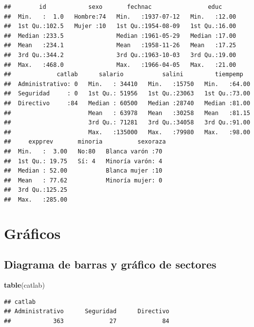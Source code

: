 \documentclass[]{book}
\newenvironment{Shaded}{\begin{snugshade}}{\end{snugshade}}
\newcommand{\KeywordTok}[1]{\textcolor[rgb]{0.13,0.29,0.53}{\textbf{#1}}}
\newcommand{\DataTypeTok}[1]{\textcolor[rgb]{0.13,0.29,0.53}{#1}}
\newcommand{\DecValTok}[1]{\textcolor[rgb]{0.00,0.00,0.81}{#1}}
\newcommand{\StringTok}[1]{\textcolor[rgb]{0.31,0.60,0.02}{#1}}
\newcommand{\OperatorTok}[1]{\textcolor[rgb]{0.81,0.36,0.00}{\textbf{#1}}}
\newcommand{\NormalTok}[1]{#1}
\begin{document}
\begin{verbatim}
##        id            sexo       fechnac                educ      
##  Min.   :  1.0   Hombre:74   Min.   :1937-07-12   Min.   :12.00  
##  1st Qu.:102.5   Mujer :10   1st Qu.:1954-08-09   1st Qu.:16.00  
##  Median :233.5               Median :1961-05-29   Median :17.00  
##  Mean   :234.1               Mean   :1958-11-26   Mean   :17.25  
##  3rd Qu.:344.2               3rd Qu.:1963-10-03   3rd Qu.:19.00  
##  Max.   :468.0               Max.   :1966-04-05   Max.   :21.00  
##             catlab      salario           salini         tiempemp    
##  Administrativo: 0   Min.   : 34410   Min.   :15750   Min.   :64.00  
##  Seguridad     : 0   1st Qu.: 51956   1st Qu.:23063   1st Qu.:73.00  
##  Directivo     :84   Median : 60500   Median :28740   Median :81.00  
##                      Mean   : 63978   Mean   :30258   Mean   :81.15  
##                      3rd Qu.: 71281   3rd Qu.:34058   3rd Qu.:91.00  
##                      Max.   :135000   Max.   :79980   Max.   :98.00  
##     expprev       minoria          sexoraza 
##  Min.   :  3.00   No:80   Blanca varón :70  
##  1st Qu.: 19.75   Sí: 4   Minoría varón: 4  
##  Median : 52.00           Blanca mujer :10  
##  Mean   : 77.62           Minoría mujer: 0  
##  3rd Qu.:125.25                             
##  Max.   :285.00
\end{verbatim}

\section{Gráficos}\label{graficos-1}

\subsection{Diagrama de barras y gráfico de
sectores}\label{diagrama-de-barras-y-grafico-de-sectores}

\begin{Shaded}
\begin{Highlighting}[]
\KeywordTok{table}\NormalTok{(catlab)}
\end{Highlighting}
\end{Shaded}

\begin{verbatim}
## catlab
## Administrativo      Seguridad      Directivo 
##            363             27             84
\end{verbatim}

\begin{Shaded}
\end{Shaded}
\end{document}
